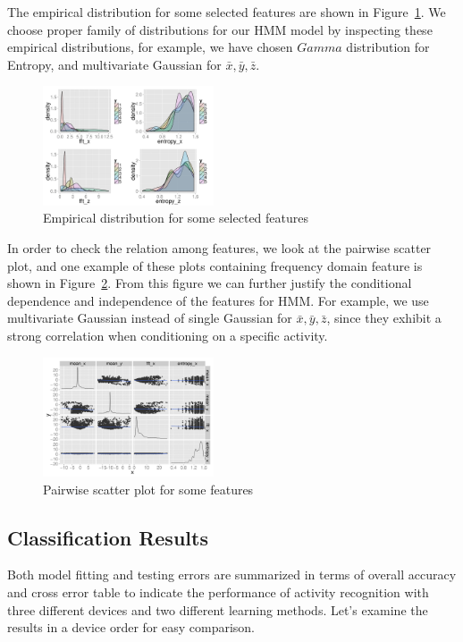 The empirical distribution for some selected features are shown in Figure~\ref{fig:features}. We choose proper family of distributions for our HMM model by inspecting these empirical distributions, for example, we have chosen $Gamma$ distribution for Entropy, and multivariate Gaussian for $\bar{x},\bar{y},\bar{z}$. 

\begin{figure}[h]
  \centering
  \includegraphics[width=0.45\textwidth]{figures/edafeature2.pdf}
  \caption{Empirical distribution for some selected features}
  \label{fig:features}
\end{figure}

In order to check the relation among features, we look at the pairwise scatter plot, and one  example of these plots containing frequency domain feature is shown in Figure~\ref{fig:pairwise}. From this figure we can further justify the conditional dependence and independence of the features for HMM. For example, we use multivariate Gaussian instead of 
single Gaussian for $\bar{x},\bar{y},\bar{z}$, since they exhibit a strong correlation when conditioning on a specific activity.

\begin{figure}[h]
  \centering
  \includegraphics[width=0.45\textwidth]{figures/edafeature1.pdf}
  \caption{Pairwise scatter plot for some features}
  \label{fig:pairwise}
\end{figure}

\subsection{Classification Results}
Both model fitting and testing errors are summarized in terms of overall accuracy and cross error table to indicate the performance of activity recognition with three different devices and two different learning methods. Let's examine the results in a device order for easy comparison.

